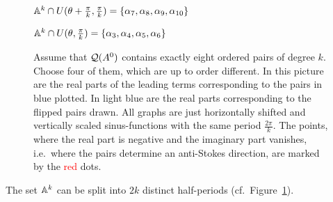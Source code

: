 \begin{figure}[h!]
\begin{center}
\begin{tikzpicture}[scale=4]

    \end{tikzpicture}
  \end{center}
  \begin{flushright}
    $\A^k\cap U(\theta+\frac{\pi}{k},\frac{\pi}{k})=\{\alpha_7,\alpha_8,\alpha_9,\alpha_{10}\}$
  \end{flushright}
  \begin{flushright}
    $\A^k\cap U(\theta,\frac{\pi}{k})=\{\alpha_3,\alpha_4,\alpha_5,\alpha_6\}$
  \end{flushright}
  \caption{Assume that $\cQ(A^0)$ contains exactly eight ordered pairs of degree
    $k$. Choose four of them, which are up to order different. In this picture
    are the real parts of the leading terms corresponding to the pairs in
    \textcolor{blue!40!black}{blue} plotted. In \textcolor{blue!60!white}{light
      blue} are the real parts corresponding to the flipped pairs drawn. All
    graphs are just horizontally shifted and vertically scaled sinus-functions
    with the same period $\frac{2\pi}{k}$. The points, where the real part is
    negative and the imaginary part vanishes, i.e.\ where the pairs determine an
    anti-Stokes direction, are marked by the \textcolor{red}{red}
    dots.}\label{fig:halfPeriod}
\end{figure} %

\begin{cor}
  The set $\A^k$ can be split into $2k$ distinct half-periods (cf.\
  Figure~\ref{fig:halfPeriod}).
\end{cor}


